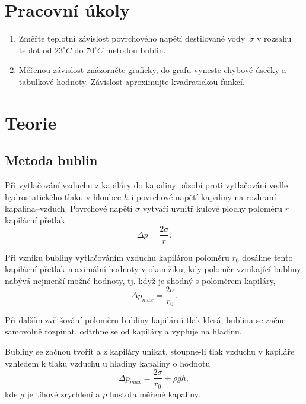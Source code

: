 \documentclass{prepareprotokol} %
\begin{document}
\maketitle

\section{Pracovní úkoly}

\begin{enumerate}
  \item Změřte teplotní závislost povrchového napětí destilované vody~$\sigma$ v rozsahu teplot od $23^\circ C$ do $70^\circ C$ metodou bublin.
  \item Měřenou závislost znázorněte graficky, do grafu vyneste chybové úsečky a tabulkové hodnoty. Závislost aproximujte kvadratickou funkcí.
\end{enumerate}


\section{Teorie}

\subsection{Metoda bublin}

Při vytlačování vzduchu z kapiláry do kapaliny působí proti vytlačování vedle hydrostatického tlaku v hloubce $h$ i povrchové napětí kapaliny na rozhraní kapalina–vzduch. Povrchové napětí $\sigma$ vytváří uvnitř kulové plochy poloměru $r$ kapilární přetlak
\begin{equation}
\Delta p = \frac{2\sigma}{r}.
\end{equation}

Při vzniku bubliny vytlačováním vzduchu kapilárou poloměru $r_0$ dosáhne tento kapilární přetlak maximální hodnoty v okamžiku, kdy poloměr vznikající bubliny nabývá nejmenší možné hodnoty, tj. když je shodný s poloměrem kapiláry,
\begin{equation}
\Delta p_{max} = \frac{2\sigma}{r_0}.
\end{equation}

Při dalším zvětšování poloměru bubliny kapilární tlak klesá, bublina se začne samovolně rozpínat, odtrhne se od kapiláry a vypluje na hladinu.

Bubliny se začnou tvořit a z kapiláry unikat, stoupne-li tlak vzduchu v kapiláře vzhledem k tlaku vzduchu u hladiny kapaliny o hodnotu
\begin{equation}
\Delta p_{max} = \frac{2\sigma}{r_0} + \rho g h,
\end{equation}
kde $g$ je tíhové zrychlení a $\rho$ hustota měřené kapaliny.
\end{document}
